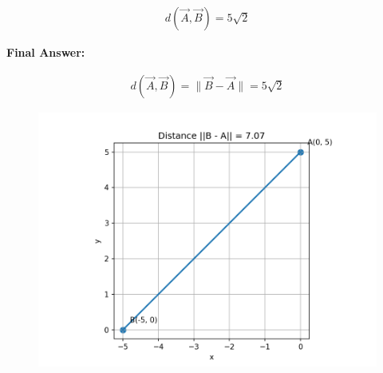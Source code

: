 \documentclass[12pt]{article}
\begin{document}
\begin{align}
 d(\vec{A},\vec{B}) = 5\sqrt{2}
\end{align}



\textbf{Final Answer:}

\begin{align}
 d(\vec{A},\vec{B}) = \|\vec{B} - \vec{A}\| = 5\sqrt{2}
\end{align}

\begin{figure}[H]
    \centering
    \includegraphics[width=1\columnwidth]{figures/distance.png}
    \caption{}
    \label{fig:placeholder}
\end{figure}
\end{document}
